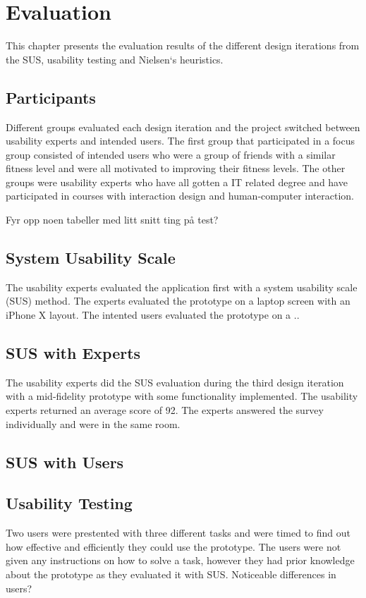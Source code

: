 \chapter{Evaluation}
This chapter presents the evaluation results of the different design iterations from the SUS, usability testing and Nielsen`s heuristics.

\section{Participants}
Different groups evaluated each design iteration and the project switched between usability experts and intended users. The first group that participated in a focus group consisted of intended users who were a group of friends with a similar fitness level and were all motivated to improving their fitness levels. The other groups were usability experts who have all gotten a IT related degree and have participated in courses with interaction design and human-computer interaction.

Fyr opp noen tabeller med litt snitt ting på test?

\section{System Usability Scale}
The usability experts evaluated the application first with a system usability scale (SUS) method. The experts evaluated the prototype on a laptop screen with an iPhone X layout. The intented users evaluated the prototype on a ..

\section{SUS with Experts}
The usability experts did the SUS evaluation during the third design iteration with a mid-fidelity prototype with some functionality implemented. The usability experts returned an average score of 92. The experts answered the survey individually and were in the same room.
\section{SUS with Users}\label{susu}

\section{Usability Testing}\label{usat}
Two users were prestented with three different tasks and were timed to find out how effective and efficiently they could use the prototype. The users were not given any instructions on how to solve a task, however they had prior knowledge about the prototype as they evaluated it with SUS. 
Noticeable differences in users?

